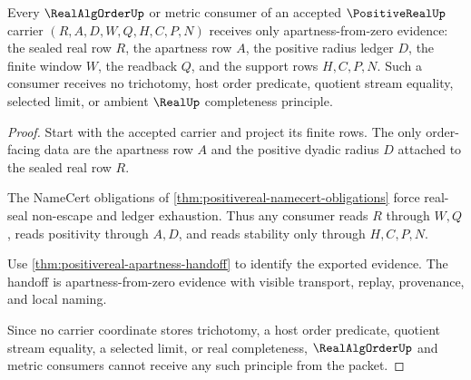 \begin{theorem}
\label{thm:positivereal-realalgorder-consumer-boundary}
Every $\RealAlgOrderUp$ or metric consumer of an accepted $\PositiveRealUp$ carrier $(R,A,D,W,Q,H,C,P,N)$ receives only apartness-from-zero evidence: the sealed real row $R$, the apartness row $A$, the positive radius ledger $D$, the finite window $W$, the readback $Q$, and the support rows $H,C,P,N$. Such a consumer receives no trichotomy, host order predicate, quotient stream equality, selected limit, or ambient $\RealUp$ completeness principle.
\end{theorem}
\begin{proof}
Start with the accepted carrier and project its finite rows. The only order-facing data are the apartness row $A$ and the positive dyadic radius $D$ attached to the sealed real row $R$.

The NameCert obligations of \autoref{thm:positivereal-namecert-obligations} force real-seal non-escape and ledger exhaustion. Thus any consumer reads $R$ through $W,Q$, reads positivity through $A,D$, and reads stability only through $H,C,P,N$.

Use \autoref{thm:positivereal-apartness-handoff} to identify the exported evidence. The handoff is apartness-from-zero evidence with visible transport, replay, provenance, and local naming.

Since no carrier coordinate stores trichotomy, a host order predicate, quotient stream equality, a selected limit, or real completeness, $\RealAlgOrderUp$ and metric consumers cannot receive any such principle from the packet.
\end{proof}

